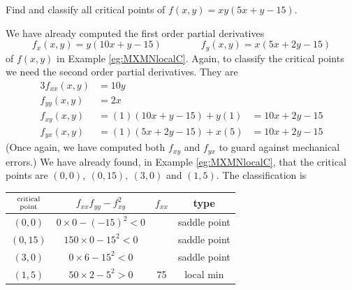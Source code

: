 \begin{eg}[$f(x,y) = xy(5x+y-15)$]\label{eg:MXMNlocalCc}
Find and classify all critical points of $f(x,y)=xy(5x+y-15)$.

\soln 
We have already computed the first order partial derivatives
\begin{equation*}
f_x(x,y)= y(10x+y-15)\qquad\qquad
f_y(x,y)= x(5x+2y-15)
\end{equation*} 
of $f(x,y)$ in Example \ref{eg:MXMNlocalC}.
Again, to classify the critical points we need the second order 
partial derivatives. They  are
\begin{alignat*}{3}
f_{xx}(x,y)&= 10y \\
f_{yy}(x,y)&= 2x \\
f_{xy}(x,y)&= (1)(10x+y-15)+y(1) &= 10x+2y-15 
 \\ f_{yx}(x,y)&= (1)(5x+2y-15)+x(5) &= 10x+2y-15 
\end{alignat*}
(Once again, we have computed both $f_{xy}$ and $f_{yx}$ to guard against
mechanical errors.)
We have already found, in Example \ref{eg:MXMNlocalC}, 
that the critical points are $(0,0),\ (0,15),\ (3,0)$ and $(1,5)$. 
The classification is
\begin{center}
\renewcommand{\arraystretch}{1.3}
     \begin{tabular}{|c|c|c|c|}
     \hline
    $\Atop{\text{critical}}{\text{point}}$  & $f_{xx}f_{yy}-f_{xy}^2$ & 
                                                          $f_{xx}$ & type \\    
    \hline
   $(0,0)$  & $0\times0-(-15)^2<0$ & & saddle point \\ \hline
   $(0,15)$ & $150\times0-15^2<0$ & & saddle point \\ \hline
   $(3,0)$  & $0\times 6-15^2<0$  & & saddle point \\ \hline
   $(1,5)$  & $50\times 2-5^2>0$ & 75 & local min \\ \hline
     \end{tabular}
\renewcommand{\arraystretch}{1.0}
\end{center}


\end{eg}
